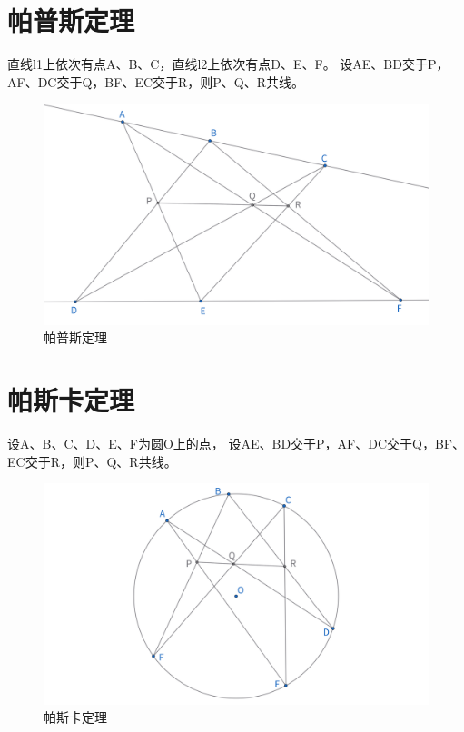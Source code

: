 \section{帕普斯定理}
\begin{theorem}
直线l1上依次有点A、B、C，直线l2上依次有点D、E、F。
设AE、BD交于P，AF、DC交于Q，BF、EC交于R，则P、Q、R共线。
\end{theorem}
\begin{figure}[H]
    \centering
    \includegraphics[width=\linewidth]{figures/帕普斯定理.png}
    \caption{帕普斯定理}
\end{figure}


\newpage
\section{帕斯卡定理}
\begin{theorem}
设A、B、C、D、E、F为圆O上的点，
设AE、BD交于P，AF、DC交于Q，BF、EC交于R，则P、Q、R共线。
\end{theorem}
\begin{figure}[H]
    \centering
    \includegraphics[width=\linewidth]{figures/帕斯卡定理.png}
    \caption{帕斯卡定理}
\end{figure}


